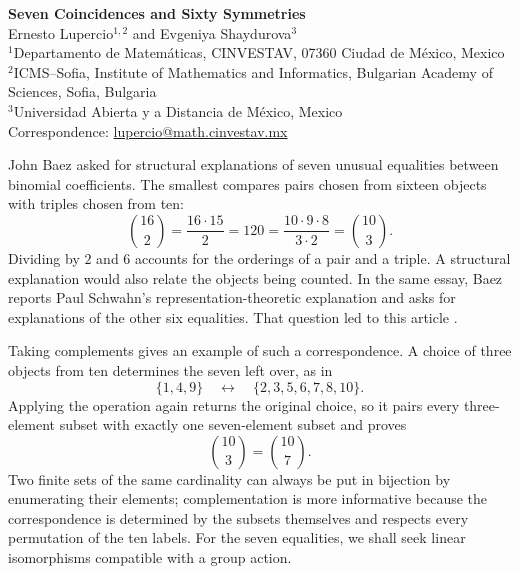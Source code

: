 \documentclass[11pt,a4paper]{article}
\begin{document}
\thispagestyle{plain}
\begin{center}
{\Large\bfseries Seven Coincidences and Sixty Symmetries}\\[0.8em]
{\large Ernesto Lupercio$^{1,2}$ and Evgeniya Shaydurova$^{3}$}\\[0.55em]
{\small $^1$Departamento de Matem\'aticas, CINVESTAV, 07360 Ciudad de M\'exico, Mexico}\\
{\small $^2$ICMS--Sofia, Institute of Mathematics and Informatics, Bulgarian Academy of Sciences, Sofia, Bulgaria}\\
{\small $^3$Universidad Abierta y a Distancia de M\'exico, Mexico}\\[0.4em]
{\small Correspondence: \href{mailto:lupercio@math.cinvestav.mx}{lupercio@math.cinvestav.mx}}
\end{center}
\vspace{0.8em}
\begin{abstract}
Motivated by John Baez's question about seven exceptional coincidences among binomial coefficients, we construct seven exterior-power identities for representations of $A_5$. Their common symmetry comes from simplex edges and icosahedral vertices, axes, and faces, together with characters of stabilizers. We enumerate all ordered pairs of representation isomorphism classes in the prescribed dimensions. Apart from the pair of trivial actions, the permutation pair at $1540$ and the complex monomial pair at $7140$ are unique. At $3003$, Klein's twelve-point divisor gives a noncanonical intertwiner factored through polynomial division, differentiation, and residues.
\end{abstract}
\vspace{0.5em}
\noindent
John Baez asked for structural explanations of seven unusual equalities between binomial coefficients. The smallest compares pairs chosen from sixteen objects with triples chosen from ten:
\[
\binom{16}{2}=\frac{16\cdot15}{2}
=120=
\frac{10\cdot9\cdot8}{3\cdot2}=\binom{10}{3}.
\]
Dividing by $2$ and $6$ accounts for the orderings of a pair and a triple. A structural explanation would also relate the objects being counted. In the same essay, Baez reports Paul Schwahn's representation-theoretic explanation and asks for explanations of the other six equalities. That question led to this article \citep{Baez2026Coincidences}.

Taking complements gives an example of such a correspondence. A choice of three objects from ten determines the seven left over, as in
\[
\{1,4,9\}\quad\longleftrightarrow\quad\{2,3,5,6,7,8,10\}.
\]
Applying the operation again returns the original choice, so it pairs every three-element subset with exactly one seven-element subset and proves
\[
\binom{10}{3}=\binom{10}{7}.
\]
Two finite sets of the same cardinality can always be put in bijection by enumerating their elements; complementation is more informative because the correspondence is determined by the subsets themselves and respects every permutation of the ten labels. For the seven equalities, we shall seek linear isomorphisms compatible with a group action.
\end{document}
